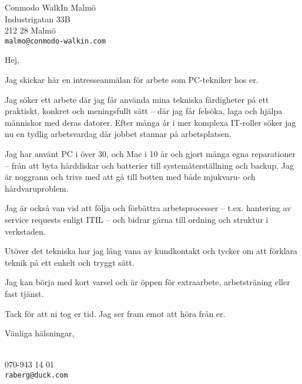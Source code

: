 \documentclass[a4paper]{scrlttr2}
\begin{document}
\begin{letter}{Conmodo WalkIn Malmö\\Industrigatan 33B\\212 28 Malmö\\\texttt{malmo@conmodo-walkin.com}}

\opening{Hej,}

Jag skickar här en intresseanmälan för arbete som PC-tekniker hos er.

Jag söker ett arbete där jag får använda mina tekniska färdigheter på ett praktiskt, konkret och meningsfullt sätt – där jag får felsöka, laga och hjälpa människor med deras datorer. Efter många år i mer komplexa IT-roller söker jag nu en tydlig arbetsvardag där jobbet stannar på arbetsplatsen.

Jag har använt PC i över 30, och Mac i 10 år och gjort många egna reparationer – från att byta hårddiskar och batterier till systemåterställning och backup. Jag är noggrann och trivs med att gå till botten med både mjukvaru- och hårdvaruproblem.

Jag är också van vid att följa och förbättra arbetsprocesser – t.ex. hantering av service requests enligt ITIL – och bidrar gärna till ordning och struktur i verkstaden.

Utöver det tekniska har jag lång vana av kundkontakt och tycker om att förklara teknik på ett enkelt och tryggt sätt.

Jag kan börja med kort varsel och är öppen för extraarbete, arbetsträning eller fast tjänst.

Tack för att ni tog er tid. Jag ser fram emot att höra från er.

\closing{Vänliga hälsningar,}\\[1em]
070-943 14 01\\
\texttt{raberg@duck.com}

\end{letter}
\end{document}
